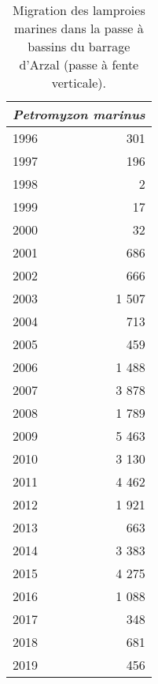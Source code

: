 \begin{table}[ht]
\centering
\begin{tabular}{lr}
 \toprule
 \multicolumn{2}{c}{\textit{Petromyzon marinus}}  \\
 \midrule
1996 & 301 \\ 
  1997 & 196 \\ 
  1998 & 2 \\ 
  1999 & 17 \\ 
  2000 & 32 \\ 
  2001 & 686 \\ 
  2002 & 666 \\ 
  2003 & 1 507 \\ 
  2004 & 713 \\ 
  2005 & 459 \\ 
  2006 & 1 488 \\ 
  2007 & 3 878 \\ 
  2008 & 1 789 \\ 
  2009 & 5 463 \\ 
  2010 & 3 130 \\ 
  2011 & 4 462 \\ 
  2012 & 1 921 \\ 
  2013 & 663 \\ 
  2014 & 3 383 \\ 
  2015 & 4 275 \\ 
  2016 & 1 088 \\ 
  2017 & 348 \\ 
  2018 & 681 \\ 
  2019 & 456 \\ 
   \bottomrule
\end{tabular}
\caption{Migration des lamproies marines dans la passe à bassins du barrage
				d'Arzal (passe à fente verticale).} 
\label{table_bilanannuel_lpm}
\end{table}
